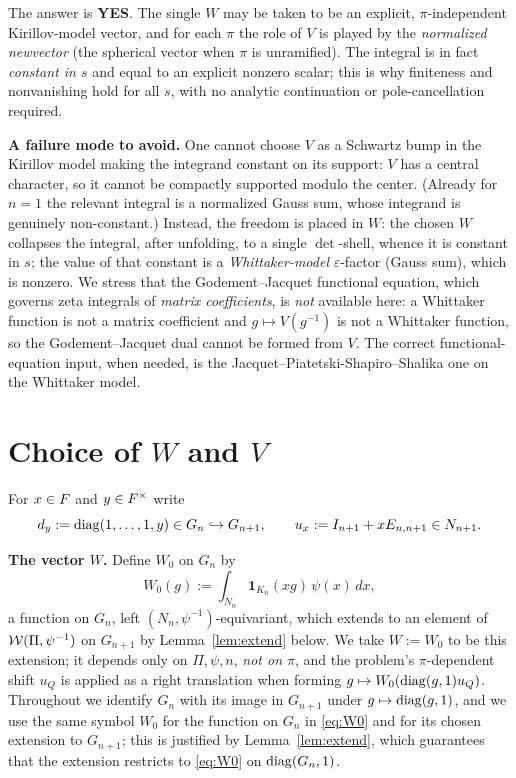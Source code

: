 \medskip
\noindent The answer is \textbf{YES}. The single $W$ may be taken to be an
explicit, $\pi$-independent Kirillov-model vector, and for each $\pi$
the role of $V$ is played by the \emph{normalized newvector} \textup{(}the spherical vector when
$\pi$ is unramified\textup{)}. The integral is in
fact \emph{constant in $s$} and equal to an explicit nonzero scalar; this is why
finiteness and nonvanishing hold for all $s$, with no analytic continuation or
pole-cancellation required.

\medskip
\noindent\textbf{A failure mode to avoid.} One cannot choose $V$ as a
Schwartz bump in the Kirillov model making the integrand constant on its
support: $V$ has a central character, so it cannot be compactly supported modulo
the center. (Already for $n=1$ the relevant integral is a normalized Gauss sum,
whose integrand is genuinely non-constant.) Instead, the freedom is placed in
$W$: the chosen $W$ collapses the integral, after unfolding, to a single
$\det$-shell, whence it is constant in $s$; the value of that constant is a
\emph{Whittaker-model} $\varepsilon$-factor \textup{(}Gauss sum\textup{)}, which
is nonzero. We stress that the Godement--Jacquet functional equation, which
governs zeta integrals of \emph{matrix coefficients}, is \emph{not} available
here: a Whittaker function is not a matrix coefficient and $g\mapsto V(g^{-1})$
is not a Whittaker function, so the Godement--Jacquet dual cannot be formed from
$V$. The correct functional-equation input, when needed, is the
Jacquet--Piatetski-Shapiro--Shalika one on the Whittaker model.

\section*{Choice of $W$ and $V$}

For $x\in F$ and $y\in F^\times$ write
\[
d_y:=\operatorname{diag}(1,\dots,1,y)\in G_n\hookrightarrow G_{n+1},\qquad
u_x:=I_{n+1}+xE_{n,n+1}\in N_{n+1}.
\]

\noindent\textbf{The vector $W$.} Define $W_0$ on $G_n$ by
\begin{equation}\label{eq:W0}
W_0(g):=\int_{N_n}\mathbf 1_{K_n}(xg)\,\psi(x)\,dx,
\end{equation}
a function on $G_n$, left $(N_n,\psi^{-1})$-equivariant, which extends to an element of
$\mathcal{W}(\Pi,\psi^{-1})$ on $G_{n+1}$ by Lemma~\ref{lem:extend} below. We take
$W:=W_0$ to be this extension; it depends only on $\Pi,\psi,n$, \emph{not on $\pi$}, and the
problem's $\pi$-dependent shift $u_Q$ is applied as a right translation when forming
$g\mapsto W_0(\operatorname{diag}(g,1)u_Q)$. Throughout we identify $G_n$
with its image in $G_{n+1}$ under $g\mapsto\operatorname{diag}(g,1)$, and we use the same symbol
$W_0$ for the function on $G_n$ in \eqref{eq:W0} and for its chosen extension to
$G_{n+1}$; this is justified by Lemma~\ref{lem:extend}, which guarantees that the
extension restricts to \eqref{eq:W0} on $\operatorname{diag}(G_n,1)$.

